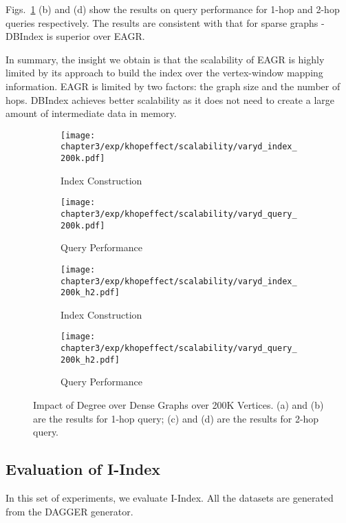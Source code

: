 Figs.~\ref{fig:khop_v200k} 
(b) and (d) show the results on query performance 
for 1-hop and 2-hop queries respectively. 
The results are consistent with that for sparse graphs
- DBIndex is superior over EAGR. 

In summary, the insight we obtain is that the scalability of EAGR 
is highly limited by its approach to build the index over 
the vertex-window mapping information. EAGR is limited 
by two factors: the graph size and the number of hops. 
DBIndex achieves better scalability as it does not need to 
create a large amount of intermediate data in memory. 

\begin{figure}[h]
\centering
\begin{subfigure}{0.48\linewidth}
  \centering
  \texttt{[image: chapter3/exp/khopeffect/scalability/varyd\_index\_200k.pdf]}
  \caption{Index Construction}
\end{subfigure}
\begin{subfigure}{0.48\linewidth}
  \centering
  \texttt{[image: chapter3/exp/khopeffect/scalability/varyd\_query\_200k.pdf]}
  \caption{Query Performance}
\end{subfigure}
\begin{subfigure}{0.48\linewidth}
  \centering
  \texttt{[image: chapter3/exp/khopeffect/scalability/varyd\_index\_200k\_h2.pdf]}
  \caption{Index Construction}
\end{subfigure}
\begin{subfigure}{0.48\linewidth}
  \centering
  \texttt{[image: chapter3/exp/khopeffect/scalability/varyd\_query\_200k\_h2.pdf]}
  \caption{Query Performance }
\end{subfigure}
\caption{Impact of Degree over Dense Graphs over 200K Vertices. (a) and (b) are the results for 1-hop query; (c) and (d) are the results for 2-hop query. }
\label{fig:khop_v200k}
\end{figure}

\subsection{Evaluation of I-Index}
In this set of experiments, we evaluate I-Index. 
All the datasets are generated from the DAGGER generator.   

